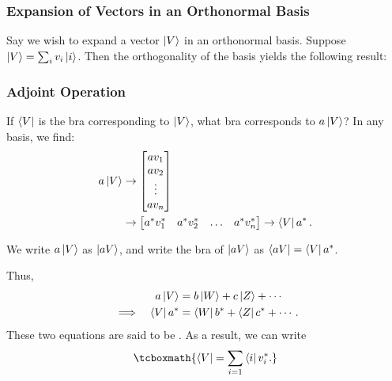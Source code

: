 
\subsubsection{Expansion of Vectors in an Orthonormal Basis}

Say we wish to expand a vector $\ket{V}$ in an orthonormal basis. Suppose $\ket{V} = \sum_i v_i \ket{i}$. Then the orthogonality of the basis yields the following result:
\begin{center}
\end{center}


\subsubsection{Adjoint Operation}

If $\bra{V}$ is the bra corresponding to $\ket{V}$, what bra corresponds to $a\ket{V}$? In any basis, we find:
\begin{align}\label{bra of multiplied ket}
    a\ket{V} &\rightarrow
    \begin{bmatrix}
    av_1 \\
    av_2 \\
    \vdots \\
    av_n
    \end{bmatrix} \\
    &\rightarrow
    \begin{bmatrix}
    a^*v_1^* & a^*v_2^* & \ldots & a^*v_n^*
    \end{bmatrix}
    \rightarrow \bra{V}a^*\,.
\end{align}

\begin{remark}
We write $a\ket{V}$ as $\ket{aV}$, and write the bra of $\ket{aV}$ as $\bra{aV} = \bra{V}a^*$.
\end{remark}

Thus,
\begin{alignat}{2}
    &&a\ket{V} &= b\ket{W} + c\ket{Z} + \cdots \\
    &\implies &\bra{V}a^* &= \bra{W}b^* + \bra{Z}c^* + \cdots\,.
\end{alignat}
These two equations are said to be . As a result, we can write
\begin{equation}\label{adjoint expansion}
    \tcboxmath{\bra{V} = \sum_{i = 1} \bra{i}v_i^*.}
\end{equation}

